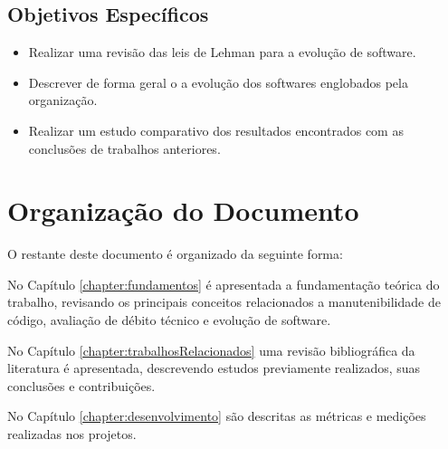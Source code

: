 \subsection{Objetivos Específicos} \label{ssec:num2}
\begin{itemize}
\item Realizar uma revisão das leis de Lehman para a evolução de software.
\item Descrever de forma geral o a evolução dos softwares englobados pela organização.
\item Realizar um estudo comparativo dos resultados encontrados com as conclusões de trabalhos anteriores.
\end{itemize}


\section{Organização do Documento}

O restante deste documento é organizado da seguinte forma:


No Capítulo \ref{chapter:fundamentos} é apresentada a fundamentação teórica do trabalho, revisando
os principais conceitos relacionados a manutenibilidade de código, avaliação de débito técnico e evolução de software.

No Capítulo \ref{chapter:trabalhosRelacionados} uma revisão bibliográfica da literatura é apresentada, descrevendo estudos previamente realizados, suas conclusões e 
contribuições.

No Capítulo \ref{chapter:desenvolvimento} são descritas as métricas e medições realizadas nos projetos.